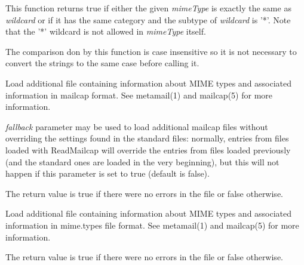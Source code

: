 
This function returns true if either the given {\it mimeType} is exactly the
same as {\it wildcard} or if it has the same category and the subtype of
{\it wildcard} is '*'. Note that the '*' wildcard is not allowed in
{\it mimeType} itself.

The comparison don by this function is case insensitive so it is not
necessary to convert the strings to the same case before calling it.

\label{wxmimetypesmanagerreadmailcap}


Load additional file containing information about MIME types and associated
information in mailcap format. See metamail(1) and mailcap(5) for more
information.

{\it fallback} parameter may be used to load additional mailcap files without
overriding the settings found in the standard files: normally, entries from
files loaded with ReadMailcap will override the entries from files loaded
previously (and the standard ones are loaded in the very beginning), but this
will not happen if this parameter is set to true (default is false).

The return value is true if there were no errors in the file or false
otherwise.

\label{wxmimetypesmanagerreadmimetypes}


Load additional file containing information about MIME types and associated
information in mime.types file format. See metamail(1) and mailcap(5) for more
information.

The return value is true if there were no errors in the file or false
otherwise.

